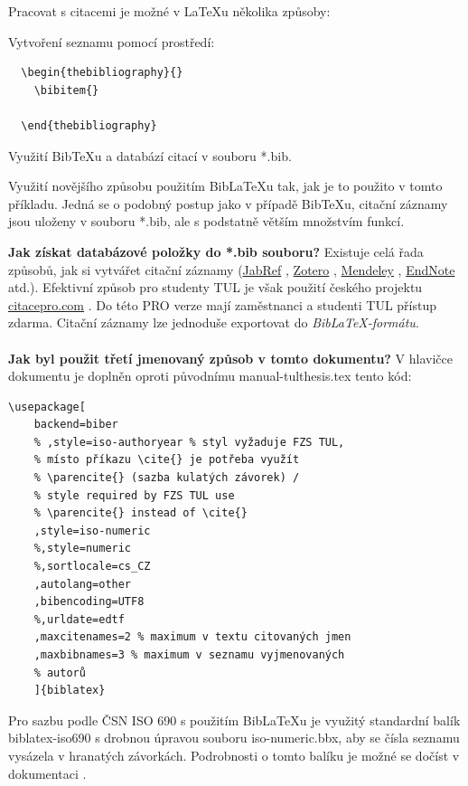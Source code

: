 \documentclass[FM,BP]{tulthesis}
\newcommand{\argument}[1]{{\ttfamily\color{\tulcolor}#1}}
\newenvironment{myquote}{\begin{list}{}{\setlength\leftmargin\parindent}\item[]}{\end{list}}
\newenvironment{listing}{\begin{myquote}\color{\tulcolor}}{\end{myquote}}
\begin{document}
Pracovat s citacemi je možné v \LaTeX{}u několika způsoby: 
\begin{enumerate}
  \item Vytvoření seznamu pomocí prostředí: 
  \begin{listing}
  \begin{verbatim}
  \begin{thebibliography}{}
    \bibitem{}
   
  \end{thebibliography}
  \end{verbatim}
  \end{listing}
  \item Využití Bib\TeX{}u a databází citací v souboru \argument{*.bib}.
  \item Využití novějšího způsobu použitím Bib\LaTeX{}u tak, jak je to použito v tomto příkladu. Jedná se o podobný postup jako v případě Bib\TeX{}u, citační záznamy jsou uloženy v souboru \argument{*.bib}, ale s podstatně větším množstvím funkcí. 
\end{enumerate}

\textbf{Jak získat databázové položky do \argument{*.bib} souboru?} Existuje celá řada způsobů, jak si vytvářet citační záznamy (\href{www.jabref.org}{JabRef} \cite{webJabRef}, \href{https://www.zotero.org}{Zotero} \cite{webZotero}, \href{https://www.mendeley.com}{Mendeley} \cite{webMendeley}, \href{https://endnote.com}{EndNote} \cite{webEndNote} atd.). Efektivní způsob pro studenty TUL je však použití českého projektu \href{citacepro.com}{citacepro.com} \cite{webCitaceCOM}. Do této PRO verze mají zaměstnanci a studenti TUL přístup zdarma. Citační záznamy lze jednoduše exportovat do \emph{Bib\LaTeX-formátu}. 

\paragraph{}
\textbf{Jak byl použit třetí jmenovaný způsob v tomto dokumentu?}
V hlavičce dokumentu je doplněn oproti původnímu \argument{manual-tulthesis.tex} tento kód:
\begin{listing}
\begin{verbatim}
\usepackage[ 
    backend=biber
    % ,style=iso-authoryear % styl vyžaduje FZS TUL, 
    % místo příkazu \cite{} je potřeba využít 
    % \parencite{} (sazba kulatých závorek) / 
    % style required by FZS TUL use 
    % \parencite{} instead of \cite{}
    ,style=iso-numeric
    %,style=numeric
    %,sortlocale=cs_CZ
    ,autolang=other
    ,bibencoding=UTF8
    %,urldate=edtf
    ,maxcitenames=2 % maximum v textu citovaných jmen
    ,maxbibnames=3 % maximum v seznamu vyjmenovaných 
    % autorů
    ]{biblatex}

\end{verbatim}
\end{listing}
Pro sazbu podle ČSN ISO 690 s použitím Bib\LaTeX{}u je využitý standardní balík \argument{biblatex-iso690} s drobnou úpravou souboru \argument{iso-numeric.bbx}, aby se čísla seznamu vysázela v hranatých závorkách. Podrobnosti o tomto balíku je možné se dočíst v dokumentaci \cite{webBiblatex-ISO690}.
\end{document}
